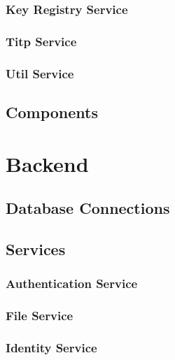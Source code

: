 \subsubsection{Key Registry Service}

\subsubsection{Titp Service}

\subsubsection{Util Service}

\subsection{Components}

\section{Backend}

\subsection{Database Connections}

\subsection{Services}

\subsubsection{Authentication Service}

\subsubsection{File Service}

\subsubsection{Identity Service}
\label{subsubsec:identitySer}

